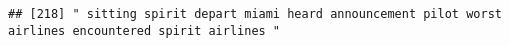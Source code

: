 \documentclass[
]{article}
\begin{document}
\begin{verbatim}
## [218] " sitting spirit depart miami heard announcement pilot worst airlines encountered spirit airlines "                                                                                                                                                                                                                                                                                                                                                                                                                                                                                                                                                                                                                                                                                                                                                                                                                                                                                                                                                                                                                                                                                                                                                                                                                                                                                                                                                                                                                                                                                                                                                                                                                                                                                             

\end{verbatim}
\end{document}
